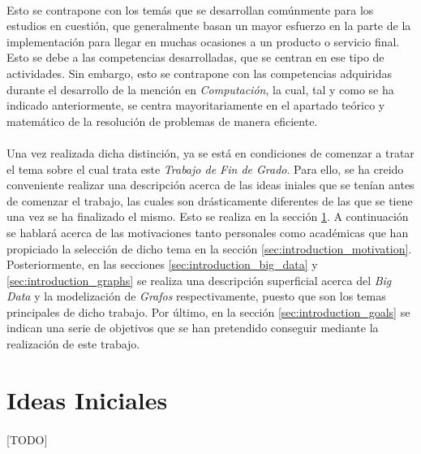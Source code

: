\documentclass{subfiles}
\begin{document}
    \paragraph{}
    Esto se contrapone con los temás que se desarrollan comúnmente para los estudios en cuestión, que generalmente basan un mayor esfuerzo en la parte de la  implementación para llegar en muchas ocasiones a un producto o servicio final. Esto se debe a las competencias desarrolladas, que se centran en ese tipo de actividades. Sin embargo, esto se contrapone con las competencias adquiridas durante el desarrollo de la mención en \emph{Computación}, la cual, tal y como se ha indicado anteriormente, se centra mayoritariamente en el apartado teórico y matemático de la resolución de problemas de manera eficiente.

    \paragraph{}
    Una vez realizada dicha distinción, ya se está en condiciones de comenzar a tratar el tema sobre el cual trata este \emph{Trabajo de Fin de Grado}. Para ello, se ha creido conveniente realizar una descripción acerca de las ideas iniales que se tenían antes de comenzar el trabajo, las cuales son drásticamente diferentes de las que se tiene una vez se ha finalizado el mismo. Esto se realiza en la sección \ref{sec:introduction_initial_ideas}. A continuación se hablará acerca de las motivaciones tanto personales como académicas que han propiciado la selección de dicho tema en la sección \ref{sec:introduction_motivation}. Posteriormente, en las secciones \ref{sec:introduction_big_data} y \ref{sec:introduction_graphs} se realiza una descripción superficial acerca del \emph{Big Data} y la modelización de \emph{Grafos} respectivamente, puesto que son los temas principales de dicho trabajo. Por último, en la sección \ref{sec:introduction_goals} se indican una serie de objetivos que se han pretendido conseguir mediante la realización de este trabajo.

    \section{Ideas Iniciales}
    \label{sec:introduction_initial_ideas}

      \paragraph{}
      [TODO]
\end{document}
